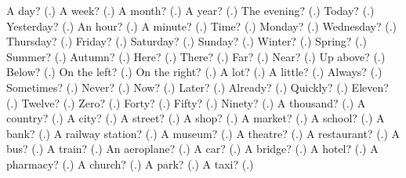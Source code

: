 \begin{tcolorbox}[breakable,colback=teal!4,colframe=teal!35!black,title={Before you move on}]
A day? (\textbf{}.) A week? (\textbf{}.) A month? (\textbf{}.) A year? (\textbf{}.) The evening? (\textbf{}.) Today? (\textbf{}.) Yesterday? (\textbf{}.) An hour? (\textbf{}.) A minute? (\textbf{}.) Time? (\textbf{}.) Monday? (\textbf{}.) Wednesday? (\textbf{}.) Thursday? (\textbf{}.) Friday? (\textbf{}.) Saturday? (\textbf{}.) Sunday? (\textbf{}.) Winter? (\textbf{}.) Spring? (\textbf{}.) Summer? (\textbf{}.) Autumn? (\textbf{}.) Here? (\textbf{}.) There? (\textbf{}.) Far? (\textbf{}.) Near? (\textbf{}.) Up above? (\textbf{}.) Below? (\textbf{}.) On the left? (\textbf{}.) On the right? (\textbf{}.) A lot? (\textbf{}.) A little? (\textbf{}.) Always? (\textbf{}.) Sometimes? (\textbf{}.) Never? (\textbf{}.) Now? (\textbf{}.) Later? (\textbf{}.) Already? (\textbf{}.) Quickly? (\textbf{}.) Eleven? (\textbf{}.) Twelve? (\textbf{}.) Zero? (\textbf{}.) Forty? (\textbf{}.) Fifty? (\textbf{}.) Ninety? (\textbf{}.) A thousand? (\textbf{}.) A country? (\textbf{}.) A city? (\textbf{}.) A street? (\textbf{}.) A shop? (\textbf{}.) A market? (\textbf{}.) A school? (\textbf{}.) A bank? (\textbf{}.) A railway station? (\textbf{}.) A museum? (\textbf{}.) A theatre? (\textbf{}.) A restaurant? (\textbf{}.) A bus? (\textbf{}.) A train? (\textbf{}.) An aeroplane? (\textbf{}.) A car? (\textbf{}.) A bridge? (\textbf{}.) A hotel? (\textbf{}.) A pharmacy? (\textbf{}.) A church? (\textbf{}.) A park? (\textbf{}.) A taxi? (\textbf{}.)
\end{tcolorbox}

